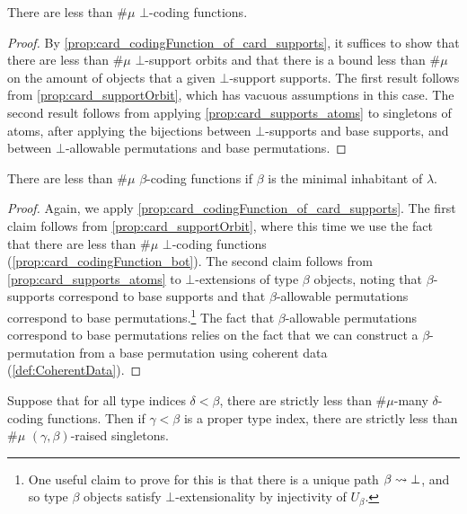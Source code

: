 \begin{proposition}
  \label{prop:card_codingFunction_bot}
  There are less than \( \#\mu \) \( \bot \)-coding functions.
\end{proposition}
\begin{proof}
  By \cref{prop:card_codingFunction_of_card_supports}, it suffices to show that there are less than \( \#\mu \) \( \bot \)-support orbits and that there is a bound less than \( \#\mu \) on the amount of objects that a given \( \bot \)-support supports.
  The first result follows from \cref{prop:card_supportOrbit}, which has vacuous assumptions in this case.
  The second result follows from applying \cref{prop:card_supports_atoms} to singletons of atoms, after applying the bijections between \( \bot \)-supports and base supports, and between \( \bot \)-allowable permutations and base permutations.
\end{proof}
\begin{proposition}
  \label{prop:card_codingFunction_min}
  There are less than \( \#\mu \) \( \beta \)-coding functions if \( \beta \) is the minimal inhabitant of \( \lambda \).
\end{proposition}
\begin{proof}
  Again, we apply \cref{prop:card_codingFunction_of_card_supports}.
  The first claim follows from \cref{prop:card_supportOrbit}, where this time we use the fact that there are less than \( \#\mu \) \( \bot \)-coding functions (\cref{prop:card_codingFunction_bot}).
  The second claim follows from \cref{prop:card_supports_atoms} to \( \bot \)-extensions of type \( \beta \) objects, noting that \( \beta \)-supports correspond to base supports and that \( \beta \)-allowable permutations correspond to base permutations.\footnote{One useful claim to prove for this is that there is a unique path \( \beta \rightsquigarrow \bot \), and so type \( \beta \) objects satisfy \( \bot \)-extensionality by injectivity of \( U_\beta \).}
  The fact that \( \beta \)-allowable permutations correspond to base permutations relies on the fact that we can construct a \( \beta \)-permutation from a base permutation using coherent data (\cref{def:CoherentData}).
\end{proof}
\begin{proposition}
  \label{prop:card_raisedSingleton}
  Suppose that for all type indices \( \delta < \beta \), there are strictly less than \( \#\mu \)-many \( \delta \)-coding functions.
  Then if \( \gamma < \beta \) is a proper type index, there are strictly less than \( \#\mu \) \( (\gamma,\beta) \)-raised singletons.
\end{proposition}

